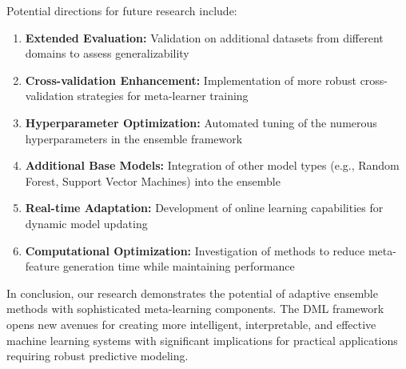 \documentclass[10pt,journal,compsoc]{IEEEtran}
\begin{document}
Potential directions for future research include:
\begin{enumerate}
    \item \textbf{Extended Evaluation:} Validation on additional datasets from different domains to assess generalizability
    \item \textbf{Cross-validation Enhancement:} Implementation of more robust cross-validation strategies for meta-learner training
    \item \textbf{Hyperparameter Optimization:} Automated tuning of the numerous hyperparameters in the ensemble framework
    \item \textbf{Additional Base Models:} Integration of other model types (e.g., Random Forest, Support Vector Machines) into the ensemble
    \item \textbf{Real-time Adaptation:} Development of online learning capabilities for dynamic model updating
    \item \textbf{Computational Optimization:} Investigation of methods to reduce meta-feature generation time while maintaining performance
\end{enumerate}

In conclusion, our research demonstrates the potential of adaptive ensemble methods with sophisticated meta-learning components. The DML framework opens new avenues for creating more intelligent, interpretable, and effective machine learning systems with significant implications for practical applications requiring robust predictive modeling.
\end{document}
